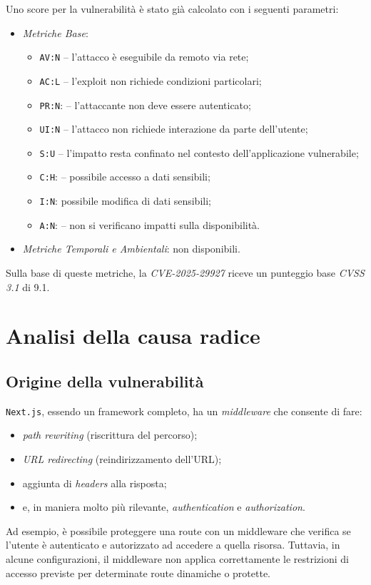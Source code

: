 \documentclass[a4paper,oneside,12pt]{report}
\begin{document}
Uno score per la vulnerabilit\`a \`e stato gi\`a calcolato con i seguenti parametri:
\begin{itemize}
  \item \emph{Metriche Base}:
	\begin{itemize}
		\item \texttt{AV:N} -- l'attacco è eseguibile da remoto via rete;
		\item \texttt{AC:L} -- l’exploit non richiede condizioni particolari;
		\item \texttt{PR:N}: -- l’attaccante non deve essere autenticato;
		\item \texttt{UI:N} -- l’attacco non richiede interazione da parte dell’utente;
		\item \texttt{S:U} -- l’impatto resta confinato nel contesto dell’applicazione vulnerabile;
		\item \texttt{C:H}: -- possibile accesso a dati sensibili;
		\item \texttt{I:N}: possibile modifica di dati sensibili;
		\item \texttt{A:N}: -- non si verificano impatti sulla disponibilit\`a.
	\end{itemize}
  \item \emph{Metriche Temporali e Ambientali}: non disponibili.
\end{itemize}

Sulla base di queste metriche, la \emph{CVE-2025-29927} riceve un punteggio base \emph{CVSS 3.1} di 9.1.

\chapter{Analisi della causa radice}
\label{chap:analisi-causa-radice}

\section{Origine della vulnerabilit\`a}
\label{sec:origine-vulnerabilita}

\texttt{Next.js}, essendo un framework completo, ha un \emph{middleware} che consente di fare:
\begin{itemize}
	\item \textit{path rewriting} (riscrittura del percorso);
	\item \textit{URL redirecting} (reindirizzamento dell'URL);
	\item aggiunta di \textit{headers} alla risposta;
	\item e, in maniera molto pi\`u rilevante, \textit{authentication} e \textit{authorization}.
\end{itemize}
Ad esempio, \`e possibile proteggere una route con un middleware che verifica se l'utente \`e autenticato e autorizzato ad accedere a quella risorsa. Tuttavia, in alcune configurazioni, il middleware non applica correttamente le restrizioni di accesso previste per determinate route dinamiche o protette.
\end{document}

